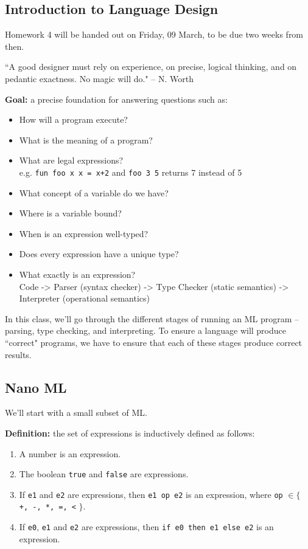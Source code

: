 \documentclass[11pt]{article}
\begin{document}
\subsection{Introduction to Language Design}

Homework 4 will be handed out on Friday, 09 March, to be due two weeks from then.

``A good designer must rely on experience, on precise, logical thinking, and on pedantic exactness. No magic will do." -- N. Worth

\textbf{Goal:} a precise foundation for answering questions such as:
\begin{itemize}
    \item How will a program execute?
    \item What is the meaning of a program?
    \item What are legal expressions? \\
            e.g. \verb~fun foo x x = x+2~ and \verb~foo 3 5~ returns 7 instead of 5
    \item What concept of a variable do we have?
    \item Where is a variable bound?
    \item When is an expression well-typed?
    \item Does every expression have a unique type?
    \item What exactly is an expression? \\
            Code -> Parser (syntax checker) -> Type Checker (static semantics) -> Interpreter (operational semantics)
\end{itemize}

In this class, we'll go through the different stages of running an ML program -- parsing, type checking, and interpreting. To ensure a language will produce ``correct" programs, we have to ensure that each of these stages produce correct results. 

\subsection{Nano ML}
We'll start with a small subset of ML. 

\textbf{Definition:} the set of expressions is inductively defined as follows:
\begin{enumerate}
    \item A number is an expression.
    \item The boolean \verb~true~ and \verb~false~ are expressions.
    \item If \verb~e1~ and \verb~e2~ are expressions, then \verb~e1 op e2~ is an expression, where \verb~op~ $\in \{$ \verb~+, -, *, =, <~ $\}$.
    \item If \verb~e0~, \verb~e1~ and \verb~e2~ are expressions, then \verb~if e0 then e1 else e2~ is an expression.
\end{enumerate}
\end{document}
